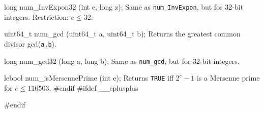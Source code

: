 {long num_InvExpon32 (int e, long z);
 \endcode
 \tab  Same as \texttt{num\_InvExpon}, but for 32-bit integers.
  Restriction: $e \le 32$.
\endtab
\code

uint64_t num_gcd (uint64_t a, uint64_t b);
 \endcode
 \tab  Returns the greatest common divisor gcd(\texttt{a,b}).
\endtab
\code

long num_gcd32 (long a, long b);
 \endcode
 \tab  Same as \texttt{num\_gcd}, but for 32-bit integers.
\endtab
\code

lebool num_isMersennePrime (int e);
 \endcode
 \tab  Returns \texttt{TRUE} iff $2^e-1$ is a Mersenne prime for $e \le 110503$.
\endtab
\code\hide
#endif
#ifdef __cplusplus
}
#endif
\endhide\endcode
